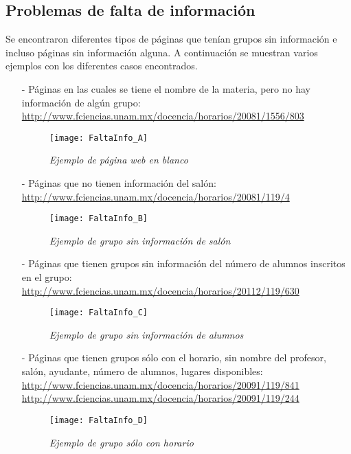 \subsection{Problemas de falta de información}

Se encontraron diferentes tipos de páginas que tenían grupos sin información e incluso páginas sin información alguna. A continuación se muestran varios ejemplos con los diferentes casos encontrados. %


\begin{itemize}
\item[-] Páginas en las cuales se tiene el nombre de la materia, pero no hay información de algún grupo: \url{http://www.fciencias.unam.mx/docencia/horarios/20081/1556/803}

\begin{figure}[H]
\centering
\texttt{[image: FaltaInfo\_A]} %
\caption{\textit{Ejemplo de página web en blanco}}
\end{figure}

\item[-] Páginas que no tienen información del salón: \url{http://www.fciencias.unam.mx/docencia/horarios/20081/119/4}

\begin{figure}[H]
\centering
\texttt{[image: FaltaInfo\_B]} %
\caption{\textit{Ejemplo de grupo sin información de salón}}
\end{figure}

\item[-] Páginas que tienen grupos sin información del número de alumnos inscritos en el grupo: \url{http://www.fciencias.unam.mx/docencia/horarios/20112/119/630}

\begin{figure}[H]
\centering
\texttt{[image: FaltaInfo\_C]} %
\caption{\textit{Ejemplo de grupo sin información de alumnos}}
\end{figure}

\item[-] Páginas que tienen grupos sólo con el horario, sin nombre del profesor, salón, ayudante, número de alumnos, lugares disponibles: \url{http://www.fciencias.unam.mx/docencia/horarios/20091/119/841} \url{http://www.fciencias.unam.mx/docencia/horarios/20091/119/244}

\begin{figure}[H]
\centering
\texttt{[image: FaltaInfo\_D]} %
\caption{\textit{Ejemplo de grupo sólo con horario}}
\end{figure}
\end{itemize}